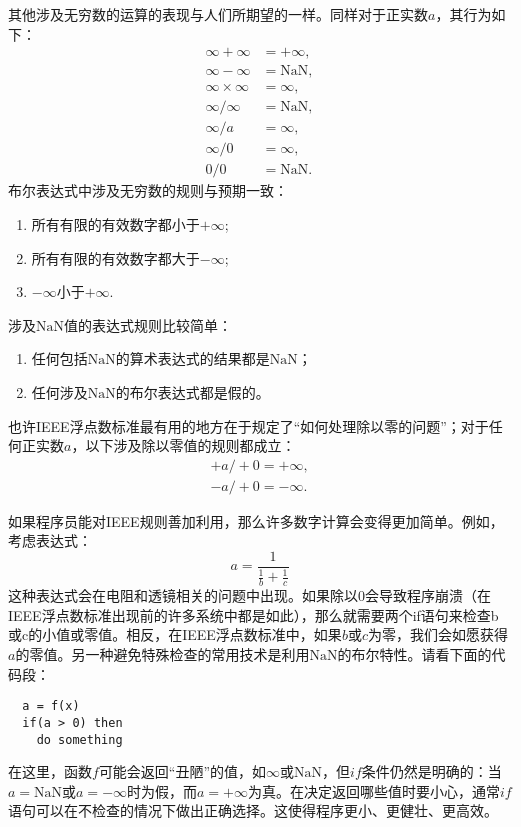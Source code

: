 \documentclass[lang=cn,12pt,marginpar=margintrue]{elegantbook}
\begin{document}
其他涉及无穷数的运算的表现与人们所期望的一样。同样对于正实数$a$，其行为如下：
\[
  \begin{aligned}
    \infty+\infty        & =+\infty,      \\
    \infty-\infty        & =\mathrm{NaN}, \\
    \infty \times \infty & =\infty,       \\
    \infty / \infty      & =\mathrm{NaN}, \\
    \infty / a           & =\infty,       \\
    \infty / 0           & =\infty,       \\
    0 / 0                & =\mathrm{NaN}.
  \end{aligned}
\]
布尔表达式中涉及无穷数的规则与预期一致：
\begin{enumerate}
  \item 所有有限的有效数字都小于$+\infty$;
  \item 所有有限的有效数字都大于$-\infty$;
  \item $-\infty$小于$+\infty$.
\end{enumerate}
涉及$\mathrm{NaN}$值的表达式规则比较简单：
\begin{enumerate}
  \item 任何包括$\mathrm{NaN}$的算术表达式的结果都是$\mathrm{NaN}$；
  \item 任何涉及$\mathrm{NaN}$的布尔表达式都是假的。
\end{enumerate}
也许IEEE浮点数标准最有用的地方在于规定了“如何处理除以零的问题”；对于任何正实数$a$，以下涉及除以零值的规则都成立：
\[
  \begin{aligned}
    +a /+0=+\infty, \\
    -a /+0=-\infty.
  \end{aligned}
\]

如果程序员能对IEEE规则善加利用，那么许多数字计算会变得更加简单。例如，考虑表达式：
\[
  a=\frac{1}{\frac{1}{b}+\frac{1}{c}}
\]
这种表达式会在电阻和透镜相关的问题中出现。如果除以0会导致程序崩溃（在IEEE浮点数标准出现前的许多系统中都是如此），那么就需要两个if语句来检查b或c的小值或零值。相反，在IEEE浮点数标准中，如果$b$或$c$为零，我们会如愿获得$a$的零值。另一种避免特殊检查的常用技术是利用$\mathrm{NaN}$的布尔特性。请看下面的代码段：
\begin{lstlisting}
  a = f(x)
  if(a > 0) then
    do something
\end{lstlisting}
在这里，函数$f$可能会返回“丑陋”的值，如$\infty$或$\mathrm{NaN}$，但$if$条件仍然是明确的：当$a=\mathrm{NaN}$或$a=-\infty$时为假，而$a=+\infty$为真。在决定返回哪些值时要小心，通常$if$语句可以在不检查的情况下做出正确选择。这使得程序更小、更健壮、更高效。
\end{document}
